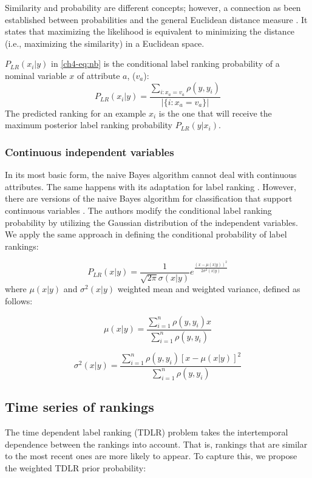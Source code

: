 \documentclass{llncs}\usepackage[]{graphicx}\usepackage[]{color}
\begin{document}
Similarity and probability are different concepts; however, a connection as been established between probabilities and the general Euclidean distance measure \cite{vogt2007}. It states  that maximizing the likelihood is equivalent to minimizing the distance (i.e., maximizing the similarity) in a Euclidean space.

$P_{LR}(x_i|y)$ in \ref{ch4-eq:nb} is the conditional label ranking probability of a nominal variable $x$ of attribute $a$, ($v_{a}$):
\begin{equation}
P_{LR}(x_i|y)= \frac{\sum_{i: x_{a} = v_{a}}\rho(y, y_i)}{|\{i: x_{a} = v_{a}\}|}
\label{ch4-eq:cond}
\end{equation}
The predicted ranking for an example $x_i$ is the one that will receive the maximum posterior label ranking probability $P_{LR}(y|x_i)$.


\subsubsection{Continuous independent variables}
\label{ch4-sec:cont}
In its most basic form, the naive Bayes algorithm cannot deal with continuous attributes. The same happens with its adaptation for label ranking \cite{aiguzhinov2010}. However, there are versions of the naive Bayes algorithm for classification that support continuous variables \cite{bouckaert2005}. The authors modify the  conditional label ranking probability  by utilizing the Gaussian distribution of the independent variables. We apply the same approach  in defining the conditional  probability of label rankings:

\begin{equation}
\label{ch4-cont}
P_{LR}(x|y)=\frac{1}{\sqrt{2\pi}\sigma(x|y)}e^\frac{(x-\mu(x|y))^2}{2\sigma^2(x|y)}
\end{equation}
where $\mu(x|y)$ and $\sigma^2(x|y)$ weighted  mean and weighted variance, defined as follows:

\begin{equation}
\label{ch4-mu}
\mu(x|y) =\frac{\sum_{i=1}^n  \rho(y,y_i) x}{\sum_{i=1}^n \rho(y,y_i)}
\end{equation}


\begin{equation}
\label{ch4-eq:sigma}
\sigma^2(x|y)=\frac{\sum_{i=1}^n \rho(y,y_i) [x-\mu(x|y)]^2}{\sum_{i=1}^n \rho(y,y_i)}
\end{equation}

\subsection{Time series of rankings}
The time dependent label ranking (TDLR) problem  takes the intertemporal dependence between the rankings into account. That is, rankings that are similar to the most recent ones are more likely to appear. %
 To capture this, we propose the weighted TDLR prior probability:
\end{document}
